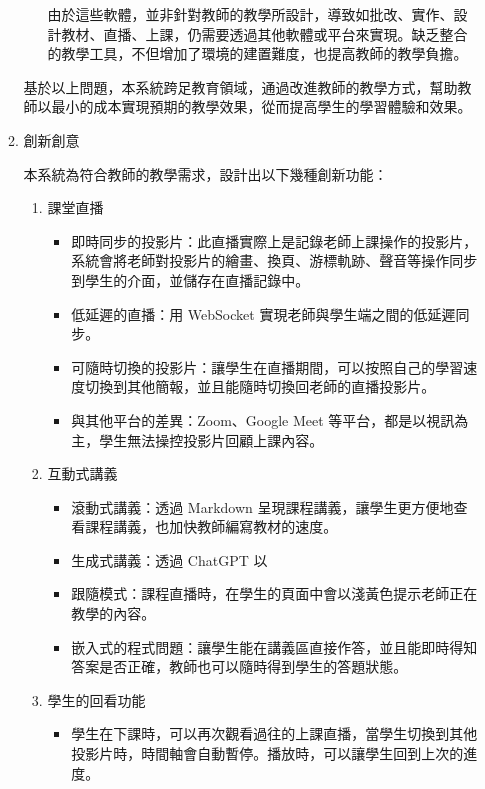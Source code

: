 \documentclass[12pt]{article}
\begin{document}
\begin{enumerate}
\begin{enumerate}
\begin{enumerate}[label=(\arabic*)]
        \par 由於這些軟體，並非針對教師的教學所設計，導致如批改、實作、設計教材、直播、上課，仍需要透過其他軟體或平台來實現。缺乏整合的教學工具，不但增加了環境的建置難度，也提高教師的教學負擔。
    \end{enumerate}
    \par 基於以上問題，本系統跨足教育領域，通過改進教師的教學方式，幫助教師以最小的成本實現預期的教學效果，從而提高學生的學習體驗和效果。
    \item 創新創意
      \par 本系統為符合教師的教學需求，設計出以下幾種創新功能：
      \begin{enumerate}[label=(\arabic*)]
        \setlength{\parindent}{2em}
        \item 課堂直播
          \begin{itemize}
            \item 即時同步的投影片：此直播實際上是記錄老師上課操作的投影片，系統會將老師對投影片的繪畫、換頁、游標軌跡、聲音等操作同步到學生的介面，並儲存在直播記錄中。
            \item 低延遲的直播：用 WebSocket 實現老師與學生端之間的低延遲同步。
            \item 可隨時切換的投影片：讓學生在直播期間，可以按照自己的學習速度切換到其他簡報，並且能隨時切換回老師的直播投影片。
            \item 與其他平台的差異：Zoom、Google Meet 等平台，都是以視訊為主，學生無法操控投影片回顧上課內容。
          \end{itemize}
        \item 互動式講義
          \begin{itemize}
            \item 滾動式講義：透過 Markdown 呈現課程講義，讓學生更方便地查看課程講義，也加快教師編寫教材的速度。
            \item 生成式講義：透過 ChatGPT 以
            \item 跟隨模式：課程直播時，在學生的頁面中會以淺黃色提示老師正在教學的內容。
            \item 嵌入式的程式問題：讓學生能在講義區直接作答，並且能即時得知答案是否正確，教師也可以隨時得到學生的答題狀態。
          \end{itemize}
        \item 學生的回看功能
          \begin{itemize}
            \item 學生在下課時，可以再次觀看過往的上課直播，當學生切換到其他投影片時，時間軸會自動暫停。播放時，可以讓學生回到上次的進度。

\end{itemize}
\end{enumerate}
\end{enumerate}
\end{enumerate}
\end{document}
